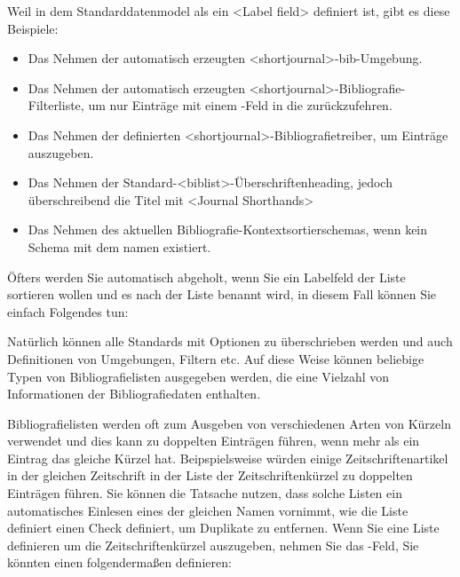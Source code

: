 \documentclass{ltxdockit}[2011/03/25]
\begin{document}
\begin{ltxsyntax}
\begin{ltxexample}
\end{ltxexample}
%
Weil  in dem Standarddatenmodel als ein <Label field>
definiert ist, gibt es diese Beispiele:
\begin{itemize}
\item Das Nehmen der automatisch erzeugten <shortjournal>-bib-Umgebung.
\item Das Nehmen der automatisch erzeugten <shortjournal>-Bibliografie-Filterliste, um nur
Einträge mit einem  -Feld in die  zurückzufehren.
\item Das Nehmen der definierten <shortjournal>-Bibliografietreiber, um Einträge auszugeben. 
\item Das Nehmen der Standard-<biblist>-Überschriftenheading, jedoch überschreibend die Titel mit <Journal Shorthands>
\item Das Nehmen des aktuellen Bibliografie-Kontextsortierschemas, wenn kein Schema mit dem namen   existiert.
\end{itemize}
%
Öfters werden Sie automatisch abgeholt, wenn Sie ein Labelfeld der Liste sortieren wollen und es nach der Liste benannt wird, in diesem Fall können Sie einfach Folgendes tun:

\begin{ltxexample}
\end{ltxexample}

Natürlich können alle Standards mit Optionen zu  überschrieben werden und auch Definitionen von Umgebungen, Filtern etc. Auf diese Weise können
beliebige Typen von Bibliografielisten ausgegeben werden, die eine Vielzahl von
Informationen der Bibliografiedaten enthalten.
\end{ltxsyntax}

Bibliografielisten werden oft zum Ausgeben von verschiedenen Arten von Kürzeln
verwendet und dies kann zu doppelten Einträgen führen, wenn mehr als ein Eintrag
das gleiche Kürzel hat. Beipspielsweise würden einige Zeitschriftenartikel in der
gleichen Zeitschrift in der Liste der Zeitschriftenkürzel zu doppelten Einträgen 
führen. Sie können die Tatsache nutzen, dass solche Listen ein automatisches Einlesen
eines  der gleichen Namen vornimmt, wie die Liste definiert einen Check definiert, um Duplikate zu entfernen. Wenn Sie eine Liste definieren um die Zeitschriftenkürzel auszugeben, nehmen Sie das -Feld,
Sie könnten einen  folgendermaßen definieren:
\end{document}
